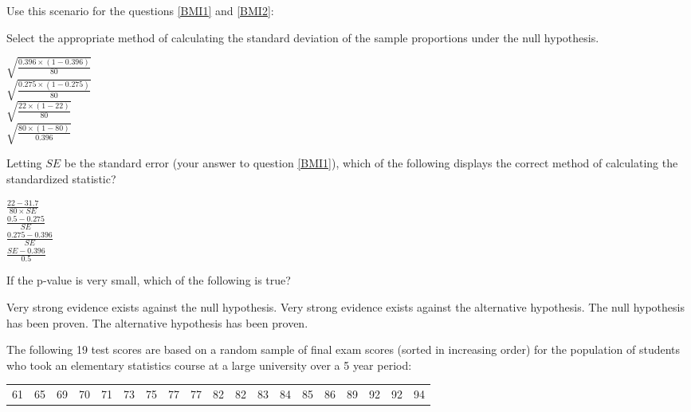 \documentclass{article}
\begin{document}
\begin{mcquestions}
\begin{mcquestioninstruction}
			Use this scenario for the questions \ref{BMI1} and \ref{BMI2}:
		\end{mcquestioninstruction}
		
		\question[follow] Select the appropriate method of calculating the standard deviation of the sample proportions under the null hypothesis. \label{BMI1}
		
		\begin{mcanswerslist}
			\answer[correct] \(\sqrt{\frac{0.396 \times (1-0.396)}{80}}\)\\[0.1cm]
			\answer \(\sqrt{\frac{0.275 \times (1-0.275)}{80}}\)\\[0.1cm]
			\answer \(\sqrt{\frac{22 \times (1-22)}{80}}\)\\[0.1cm]
			\answer \(\sqrt{\frac{80 \times (1-80)}{0.396}}\)\\[0.1cm]
		\end{mcanswerslist}
		
		\question[follow] Letting \(SE\) be the standard error (your answer to question \ref{BMI1}), which of the following displays the correct method of calculating the standardized statistic? \label{BMI2}
		
		\begin{mcanswerslist}
			\answer \(\frac{22-31.7}{80\times SE}\)\\[0.1cm]
			\answer \(\frac{0.5-0.275}{SE}\)\\[0.1cm]
			\answer[correct] \(\frac{0.275-0.396}{SE}\)\\[0.1cm]
			\answer \(\frac{SE-0.396}{0.5}\)\\[0.1cm]
		\end{mcanswerslist}
		
		\question If the p-value is very small, which of the following is true?
		\begin{mcanswerslist}
			\answer[correct] Very strong evidence exists against the null hypothesis.
			\answer Very strong evidence exists against the alternative hypothesis.
			\answer The null hypothesis has been proven.
			\answer The alternative hypothesis has been proven.
		\end{mcanswerslist}
		
		\question The following 19 test scores are based on a random sample of final exam scores (sorted in increasing order) for the population of students who took an elementary statistics course at a large university over a 5 year period:
		
		\begin{tabular}{ccccccccccccccccccc}
			61 &  65 &  69  & 70  & 71 &  73  & 75 &  77 &  77 &  82  & 82 &  83 &  84 &  85 &  86 &  89 &  92  & 92 &  94
		\end{tabular}
		

\end{mcquestions}
\end{document}

